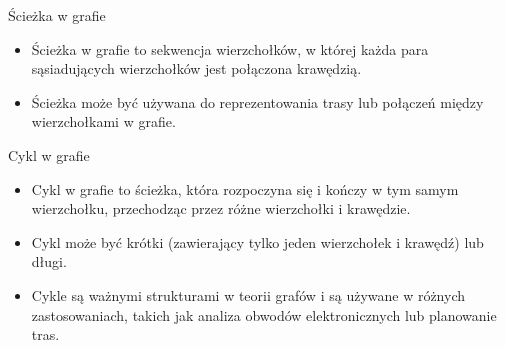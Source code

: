 \documentclass[polish,envcountsect,10pt]{beamer}
\begin{document}
\begin{frame}{Ścieżka w grafie}
    \begin{itemize}
        \item Ścieżka w grafie to sekwencja wierzchołków, w której każda para sąsiadujących wierzchołków jest połączona krawędzią.
        \item Ścieżka może być używana do reprezentowania trasy lub połączeń między wierzchołkami w grafie.
    \end{itemize}  
    \begin{center}
    \end{center}
\end{frame}

\begin{frame}{Cykl w grafie}
    \begin{itemize}
        \item Cykl w grafie to ścieżka, która rozpoczyna się i kończy w tym samym wierzchołku, przechodząc przez różne wierzchołki i krawędzie.
        \item Cykl może być krótki (zawierający tylko jeden wierzchołek i krawędź) lub długi.
        \item Cykle są ważnymi strukturami w teorii grafów i są używane w różnych zastosowaniach, takich jak analiza obwodów elektronicznych lub planowanie tras.
    \end{itemize}  
    \begin{center}
    \end{center}
\end{frame}
\end{document}
